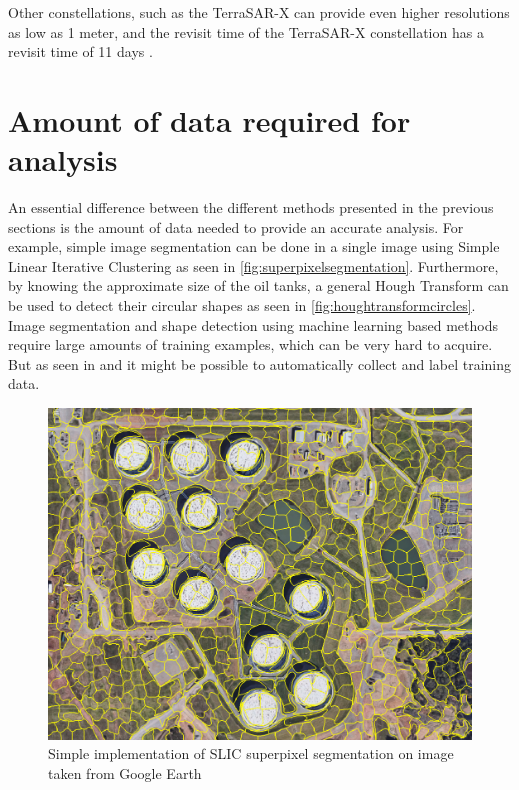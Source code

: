 Other constellations, such as the TerraSAR-X can provide even higher resolutions as low as 1 meter, and the revisit time of the TerraSAR-X constellation has a revisit time of 11 days \citep{AirBus2017}. 

\section{Amount of data required for analysis}
An essential difference between the different methods presented in the previous sections is the amount of data needed to provide an accurate analysis. For example, simple image segmentation can be done in a single image using Simple Linear Iterative Clustering \citep{Achanta2012} as seen in \autoref{fig:superpixelsegmentation}. Furthermore, by knowing the approximate size of the oil tanks, a general Hough Transform \citep{Ballard1981} can be used to detect their circular shapes as seen in \autoref{fig:houghtransformcircles}. Image segmentation and shape detection using machine learning based methods require large amounts of training examples, which can be very hard to acquire. But as seen in \cite{Kaiser2017} and \cite{Kemker2017} it might be possible to automatically collect and label training data.

\begin{figure}[!h]
	\centering
	\includegraphics[scale=0.4]{fig/superpixel_segmentation.png}
	\caption{Simple implementation of SLIC superpixel segmentation on image taken from Google Earth}
	\label{fig:superpixelsegmentation}
\end{figure}

